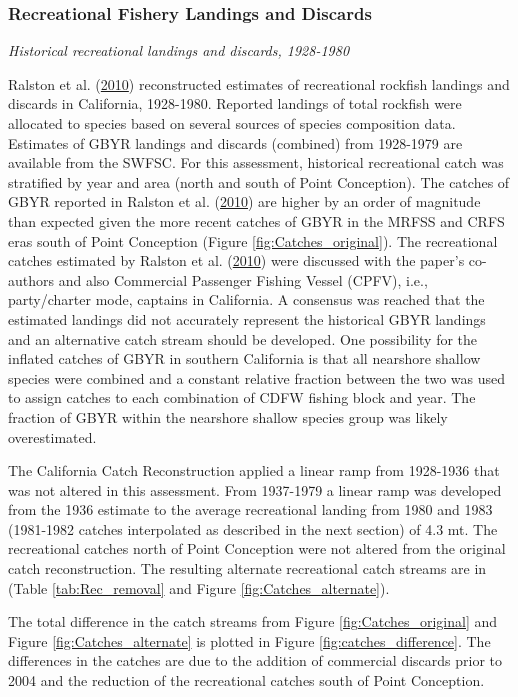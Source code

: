 \documentclass[12pt,]{article}
\begin{document}
\subsubsection{Recreational Fishery Landings and
Discards}\label{recreational-fishery-landings-and-discards}

\emph{Historical recreational landings and discards, 1928-1980}

Ralston et al. (\protect\hyperlink{ref-Ralston2010}{2010}) reconstructed
estimates of recreational rockfish landings and discards in California,
1928-1980. Reported landings of total rockfish were allocated to species
based on several sources of species composition data. Estimates of GBYR
landings and discards (combined) from 1928-1979 are available from the
SWFSC. For this assessment, historical recreational catch was stratified
by year and area (north and south of Point Conception). The catches of
GBYR reported in Ralston et al.
(\protect\hyperlink{ref-Ralston2010}{2010}) are higher by an order of
magnitude than expected given the more recent catches of GBYR in the
MRFSS and CRFS eras south of Point Conception (Figure
\ref{fig:Catches_original}). The recreational catches estimated by
Ralston et al. (\protect\hyperlink{ref-Ralston2010}{2010}) were
discussed with the paper's co-authors and also Commercial Passenger
Fishing Vessel (CPFV), i.e., party/charter mode, captains in California.
A consensus was reached that the estimated landings did not accurately
represent the historical GBYR landings and an alternative catch stream
should be developed. One possibility for the inflated catches of GBYR in
southern California is that all nearshore shallow species were combined
and a constant relative fraction between the two was used to assign
catches to each combination of CDFW fishing block and year. The fraction
of GBYR within the nearshore shallow species group was likely
overestimated.

The California Catch Reconstruction applied a linear ramp from 1928-1936
that was not altered in this assessment. From 1937-1979 a linear ramp
was developed from the 1936 estimate to the average recreational landing
from 1980 and 1983 (1981-1982 catches interpolated as described in the
next section) of 4.3 mt. The recreational catches north of Point
Conception were not altered from the original catch reconstruction. The
resulting alternate recreational catch streams are in (Table
\ref{tab:Rec_removal} and Figure \ref{fig:Catches_alternate}).

The total difference in the catch streams from Figure
\ref{fig:Catches_original} and Figure \ref{fig:Catches_alternate} is
plotted in Figure \ref{fig:catches_difference}. The differences in the
catches are due to the addition of commercial discards prior to 2004 and
the reduction of the recreational catches south of Point Conception.
\end{document}
